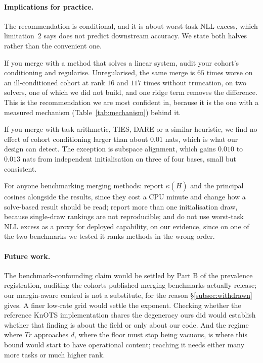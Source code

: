\paragraph{Implications for practice.} The recommendation is conditional,
and it is about worst-task NLL excess, which limitation~2 says does not
predict downstream accuracy. We state both halves rather than the
convenient one.

If you merge with a method that solves a linear system, audit your cohort's
conditioning and regularise. Unregularised, the same merge is $65$ times
worse on an ill-conditioned cohort at rank $16$ and $117$ times without
truncation, on two solvers, one of which we did not build, and one ridge
term removes the difference. This is the recommendation we are most
confident in, because it is the one with a measured mechanism
(Table~\ref{tab:mechanism}) behind it.

If you merge with task arithmetic, TIES, DARE or a similar heuristic, we
find no effect of cohort conditioning larger than about $0.01$ nats, which
is what our design can detect. The exception is subspace alignment, which
gains $0.010$ to $0.013$ nats from independent initialisation on three of
four bases, small but consistent.

For anyone benchmarking merging methods: report $\kappa(\bar H)$ and the
principal cosines alongside the results, since they cost a CPU minute and
change how a solve-based result should be read; report more than one
initialisation draw, because single-draw rankings are not reproducible; and
do not use worst-task NLL excess as a proxy for deployed capability, on our
evidence, since on one of the two benchmarks we tested it ranks methods in
the wrong order.

\paragraph{Future work.} The benchmark-confounding claim would be settled by
Part B of the prevalence registration, auditing the cohorts published
merging benchmarks actually release; our margin-aware control is not a
substitute, for the reason \S\ref{subsec:withdrawn} gives. A
finer low-rate grid would settle the exponent. Checking whether the reference
KnOTS implementation shares the degeneracy ours did would establish whether
that finding is about the field or only about our code. And the regime where
$Tr$ approaches $d$, where the floor must stop being vacuous, is where this
bound would start to have operational content; reaching it needs either many
more tasks or much higher rank.

